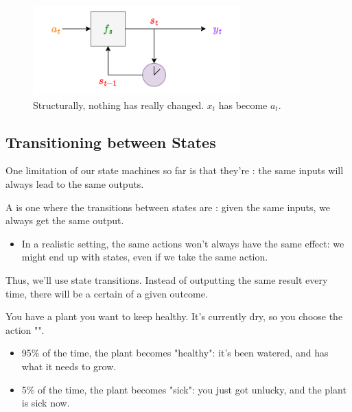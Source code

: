         \begin{figure}[H]
            \centering
            \includegraphics[width=80mm,scale=0.5]{images/mdp_images/action.png}
            
            \caption*{Structurally, nothing has really changed. $x_t$ has become $a_t$.}
        \end{figure}




    \phantom{}

    \subsection{Transitioning between States}

        One limitation of our state machines so far is that they're : the same inputs will always lead to the same outputs.\\

        \begin{definition}
            A  is one where the transitions between states are : given the same inputs, we always get the same output.
        \end{definition}

        \begin{itemize}
            \item In a realistic setting, the same actions won't always have the same effect: we might end up with  states, even if we take the same action.
        \end{itemize}

        Thus, we'll use  state transitions. Instead of outputting the same result every time, there will be a certain  of a given outcome.

        \miniex You have a plant you want to keep healthy. It's currently dry, so you choose the action "".

        \begin{itemize}
            \item 95\% of the time, the plant becomes "healthy": it's been watered, and has what it needs to grow.
            \item 5\% of the time, the plant becomes "sick": you just got unlucky, and the plant is sick now. 
        \end{itemize}

